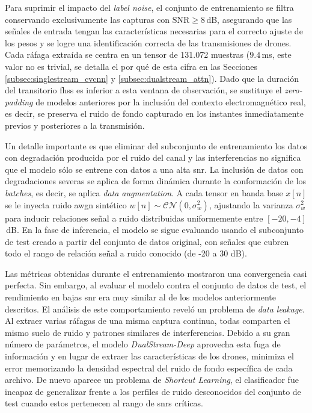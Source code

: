 Para suprimir el impacto del \textit{label noise}, el conjunto de entrenamiento se filtra conservando exclusivamente las capturas con $\text{SNR} \ge 8$\,dB, asegurando que las señales de entrada tengan las características necesarias para el correcto ajuste de los pesos y se logre una identificación correcta de las transmisiones de drones. Cada ráfaga extraída se centra en un tensor de 131.072 muestras ($9.4$\,ms, este valor no es trivial, se detalla el por qué de esta cifra en las Secciones \ref{subsec:singlestream_cvcnn} y \ref{subsec:dualstream_attn}). Dado que la duración del transitorio \gls{fhss} es inferior a esta ventana de observación, se sustituye el \textit{zero-padding} de modelos anteriores por la inclusión del contexto electromagnético real, es decir, se preserva el ruido de fondo capturado en los instantes inmediatamente previos y posteriores a la transmisión.

Un detalle importante es que eliminar del subconjunto de entrenamiento los datos con degradación producida por el ruido del canal y las interferencias no significa que el modelo sólo se entrene con datos a una alta \gls{snr}. La inclusión de datos con degradaciones severas se aplica de forma dinámica durante la conformación de los \textit{batches}, es decir, se aplica \textit{data augmentation}. A cada tensor en banda base $x[n]$ se le inyecta ruido \gls{awgn} sintético $w[n] \sim \mathcal{CN}(0, \sigma_w^2)$, ajustando la varianza $\sigma_w^2$ para inducir relaciones señal a ruido distribuidas uniformemente entre $[-20, -4]$\,dB. En la fase de inferencia, el modelo se sigue evaluando usando el subconjunto de test creado a partir del conjunto de datos original, con señales que cubren todo el rango de relación señal a ruido conocido (de -20 a 30 dB).

Las métricas obtenidas durante el entrenamiento mostraron una convergencia casi perfecta. Sin embargo, al evaluar el modelo contra el conjunto de datos de test, el rendimiento en bajas \gls{snr} era muy similar al de los modelos anteriormente descritos. El análisis de este comportamiento reveló un problema de \textit{data leakage}. Al extraer varias ráfagas de una misma captura continua, todas comparten el mismo suelo de ruido y patrones similares de interferencias. Debido a su gran número de parámetros, el modelo \textit{DualStream-Deep} aprovecha esta fuga de información y en lugar de extraer las características de los drones, minimiza el error memorizando la densidad espectral del ruido de fondo específica de cada archivo. De nuevo aparece un problema de \textit{Shortcut Learning}, el clasificador fue incapaz de generalizar frente a los perfiles de ruido desconocidos del conjunto de test cuando estos pertenecen al rango de \gls{snr}s críticas.

